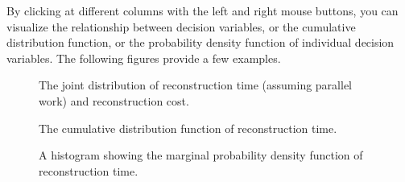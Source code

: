 By clicking at different columns with the left and right mouse buttons, you can visualize the relationship between decision variables, or the cumulative distribution function, or the probability density function of individual decision variables. The following figures provide a few examples.

\begin{figure}[!htbp]
  \caption{The joint distribution of reconstruction time (assuming parallel work) and reconstruction cost.}
  \label{fig:ex_1_RES_2}
\end{figure}

\begin{figure}[!htbp]
  \caption{The cumulative distribution function of reconstruction time.}
  \label{fig:ex_1_RES_3}
\end{figure}

\begin{figure}[!htbp]
  \caption{A histogram showing the marginal probability density function of reconstruction time.}
  \label{fig:ex_1_RES_4}
\end{figure}